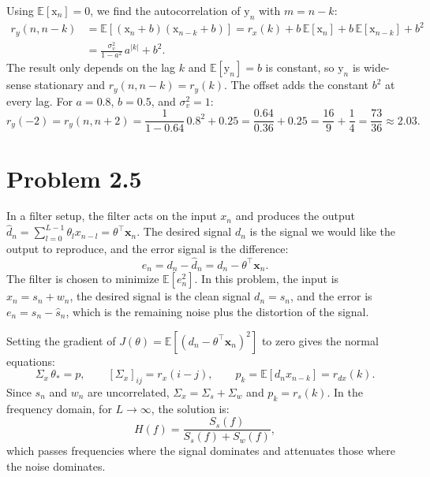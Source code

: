 \documentclass[11pt, a4paper]{article}
\begin{document}
Using $\mathbb{E}[\mathrm{x}_n]=0$, we find the autocorrelation of $\mathrm{y}_n$ with $m=n-k$:
\begin{align}
    r_y(n,n-k)&=\mathbb{E}[(\mathrm{x}_n+b)(\mathrm{x}_{n-k}+b)]
    =r_x(k)+b\,\mathbb{E}[\mathrm{x}_n]+b\,\mathbb{E}[\mathrm{x}_{n-k}]+b^2\nonumber\\
    &=\frac{\sigma_v^2}{1-a^2}\,a^{|k|}+b^2 .
\end{align}
The result only depends on the lag $k$ and $\mathbb{E}[\mathrm{y}_n]=b$ is constant, so $\mathrm{y}_n$ is wide-sense stationary and $r_y(n,n-k)=r_y(k)$. The offset adds the constant $b^2$ at every lag. For $a=0.8$, $b=0.5$, and $\sigma_v^2=1$:
\begin{equation}
    r_y(-2)=r_y(n,n+2)=\frac{1}{1-0.64}\,0.8^{2}+0.25=\frac{0.64}{0.36}+0.25=\frac{16}{9}+\frac14=\frac{73}{36}\approx 2.03 .
\end{equation}

\section*{Problem 2.5}
In a filter setup, the filter acts on the input $x_n$ and produces the output $\hat d_n=\sum_{l=0}^{L-1}\theta_l x_{n-l}=\theta^\top \boldsymbol{x}_n$. The desired signal $d_n$ is the signal we would like the output to reproduce, and the error signal is the difference:
\begin{equation}
    e_n=d_n-\hat d_n=d_n-\theta^\top\boldsymbol{x}_n .
\end{equation}
The filter is chosen to minimize $\mathbb{E}[e_n^2]$. In this problem, the input is $x_n=s_n+w_n$, the desired signal is the clean signal $d_n=s_n$, and the error is $e_n=s_n-\hat s_n$, which is the remaining noise plus the distortion of the signal. 

Setting the gradient of $J(\theta)=\mathbb{E}[(d_n-\theta^\top\boldsymbol{x}_n)^2]$ to zero gives the normal equations:
\begin{equation}
    \Sigma_x\,\theta_*=p,\qquad [\Sigma_x]_{ij}=r_x(i-j),\qquad p_k=\mathbb{E}[d_n x_{n-k}]=r_{dx}(k).
\end{equation}
Since $s_n$ and $w_n$ are uncorrelated, $\Sigma_x=\Sigma_s+\Sigma_w$ and $p_k=r_s(k)$. In the frequency domain, for $L\to\infty$, the solution is:
\begin{equation}
    H(f)=\frac{S_s(f)}{S_s(f)+S_w(f)},
\end{equation}
which passes frequencies where the signal dominates and attenuates those where the noise dominates. 
\end{document}
